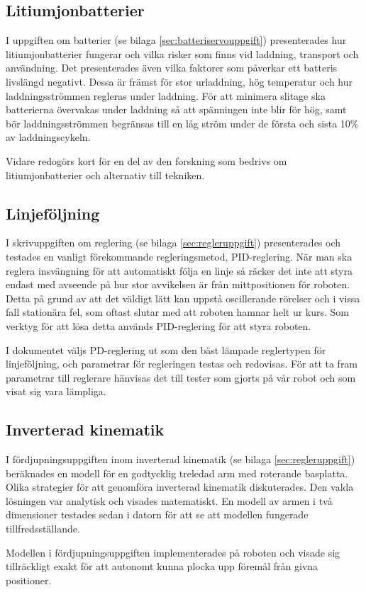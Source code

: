 \subsection{Litiumjonbatterier}

I uppgiften om batterier (se bilaga \ref{sec:batteriservouppgift}) presenterades hur litiumjonbatterier fungerar och vilka risker som finns vid laddning, transport och användning. Det presenterades även vilka faktorer som påverkar ett batteris livslängd negativt. Dessa är främst för stor urladdning, hög temperatur och hur laddningsströmmen regleras under laddning. För att minimera slitage ska batterierna övervakas under laddning så att spänningen inte blir för hög, samt bör laddningsströmmen begränsas till en låg ström under de första och sista 10\% av laddningscykeln.

Vidare redogörs kort för en del av den forskning som bedrivs om litiumjonbatterier och alternativ till tekniken.

\subsection{Linjeföljning}

I skrivuppgiften om reglering (se bilaga \ref{sec:regleruppgift}) presenterades och testades en vanligt förekommande regleringsmetod, PID-reglering. När man ska reglera insvängning för att automatiskt följa en linje så räcker det inte att styra endast med avseende på hur stor avvikelsen är från mittpositionen för roboten. Detta på grund av att det väldigt lätt kan uppstå oscillerande rörelser och i vissa fall stationära fel, som oftast slutar med att roboten hamnar helt ur kurs. Som verktyg för att lösa detta används PID-reglering för att styra roboten.

I dokumentet väljs PD-reglering ut som den bäst lämpade reglertypen för linjeföljning, och parametrar för regleringen testas och redovisas. För att ta fram parametrar till reglerare hänvisas det till tester som gjorts på vår robot och som visat sig vara lämpliga.

\subsection{Inverterad kinematik}
I fördjupningsuppgiften inom inverterad kinematik (se bilaga \ref{sec:regleruppgift}) beräknades en modell för en godtycklig treledad arm med roterande basplatta. Olika strategier för att genomföra inverterad kinematik diskuterades. Den valda lösningen var analytisk och visades matematiskt. En modell av armen i två dimensioner testades sedan i datorn för att se att modellen fungerade tillfredsställande.

Modellen i fördjupningsuppgiften implementerades på roboten och visade sig tillräckligt exakt för att autonomt kunna plocka upp föremål från givna positioner.